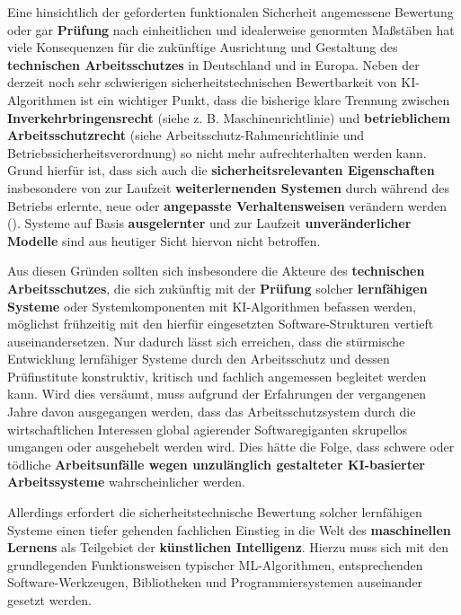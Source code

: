 \documentclass [oneside,10pt,a4paper,ngerman,BCOR10mm,headsepline,parindent,final]{scrartcl}
\begin{document}
Eine hinsichtlich der geforderten funktionalen Sicherheit angemessene
Bewertung oder gar \textbf{Prüfung} nach einheitlichen und idealerweise
genormten Maßstäben hat viele Konsequenzen für die zukünftige
Ausrichtung und Gestaltung des \textbf{technischen Arbeitsschutzes} in
Deutschland und in Europa. Neben der derzeit noch sehr schwierigen
sicherheitstechnischen Bewertbarkeit von KI-Algorithmen ist ein
wichtiger Punkt, dass die bisherige klare Trennung zwischen
\textbf{Inverkehrbringensrecht} (siehe z. B. Maschinenrichtlinie) und
\textbf{betrieblichem Arbeitsschutzrecht} (siehe
Arbeitsschutz-Rahmenrichtlinie und Betriebssicherheitsverordnung) so
nicht mehr aufrechterhalten werden kann. Grund hierfür ist, dass sich
auch die \textbf{sicherheitsrelevanten Eigenschaften} insbesondere von
zur Laufzeit \textbf{weiterlernenden Systemen} durch während des
Betriebs erlernte, neue oder \textbf{angepasste Verhaltensweisen}
verändern werden (\cite{BAuA_Rechtsgutachten_KI_2021}). Systeme auf
Basis \textbf{ausgelernter} und zur Laufzeit \textbf{unveränderlicher
Modelle} sind aus heutiger Sicht hiervon nicht betroffen.

Aus diesen Gründen sollten sich insbesondere die Akteure des
\textbf{technischen Arbeitsschutzes}, die sich zukünftig mit der
\textbf{Prüfung} solcher \textbf{lernfähigen Systeme} oder
Systemkomponenten mit KI-Algorithmen befassen werden, möglichst
frühzeitig mit den hierfür eingesetzten Software-Strukturen vertieft
auseinandersetzen. Nur dadurch lässt sich erreichen, dass die stürmische
Entwicklung lernfähiger Systeme durch den Arbeitsschutz und dessen
Prüfinstitute konstruktiv, kritisch und fachlich angemessen begleitet
werden kann. Wird dies versäumt, muss aufgrund der Erfahrungen der
vergangenen Jahre davon ausgegangen werden, dass das Arbeitsschutzsystem
durch die wirtschaftlichen Interessen global agierender Softwaregiganten
skrupellos umgangen oder ausgehebelt werden wird. Dies hätte die Folge,
dass schwere oder tödliche \textbf{Arbeitsunfälle wegen unzulänglich
gestalteter KI-basierter Arbeitssysteme} wahrscheinlicher werden.

Allerdings erfordert die sicherheitstechnische Bewertung solcher
lernfähigen Systeme einen tiefer gehenden fachlichen Einstieg in die
Welt des \textbf{maschinellen Lernens} als Teilgebiet der
\textbf{künstlichen Intelligenz}. Hierzu muss sich mit den grundlegenden
Funktionsweisen typischer ML-Algorithmen, entsprechenden
Software-Werkzeugen, Bibliotheken und Programmiersystemen auseinander
gesetzt werden.
\end{document}
